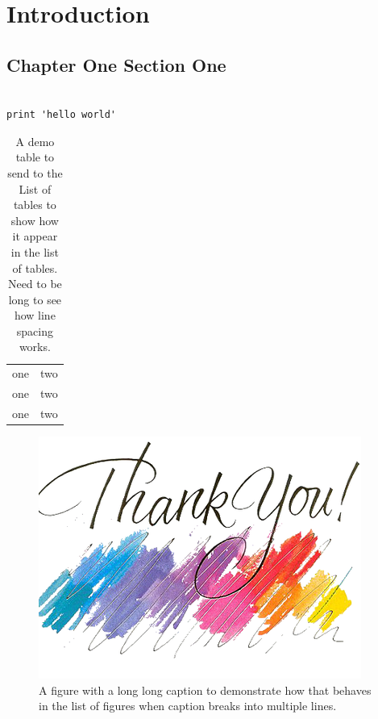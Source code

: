 \chapter{Introduction}
\section{Chapter One Section One}

\begin{lstlisting}[float, caption={Python listing to demonstrate how it behaves in the list of listings. Note that under the title List of Listings, there are no subtitles Listing........ Page}, label=lst:node]

print 'hello world'
\end{lstlisting}


\begin{table}[htb!]
	\centering
	\caption{A demo table to send to the List of tables to show how it appear in the list of tables. Need to be long to see how line spacing works.}
	\begin{tabu}{ X[c]X[c] }
	 one & two \\
	 one & two \\
	 one & two \\
	\end{tabu}
\end{table}


\begin{figure}[htb!]
	\centering
		\includegraphics{thank_you}
	\caption{A figure with a long long caption to demonstrate how that behaves in the list of figures when caption breaks into multiple lines.}
\end{figure}



